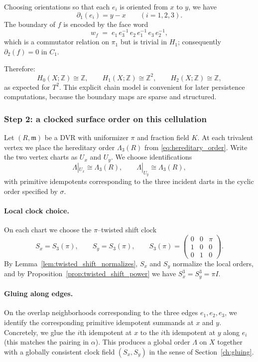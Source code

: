 \documentclass[11pt,oneside]{amsbook}
\numberwithin{equation}{section}
\theoremstyle{plain}
\theoremstyle{definition}
\theoremstyle{remark}
\newcommand{\Z}{\mathbb{Z}}
\begin{document}
Choosing orientations so that each $e_i$ is oriented from $x$ to $y$, we have
\[
\partial_1(e_i)=y-x\qquad (i=1,2,3).
\]
The boundary of $f$ is encoded by the face word
\[
w_f \;=\; e_1\,e_3^{-1}\,e_2\,e_1^{-1}\,e_3\,e_2^{-1},
\]
which is a commutator relation on $\pi_1$ but is trivial in $H_1$; consequently $\partial_2(f)=0$ in $C_1$.

Therefore:
\[
H_0(X;\Z)\cong \Z,\qquad H_1(X;\Z)\cong \Z^2,\qquad H_2(X;\Z)\cong \Z,
\]
as expected for $T^2$.
This explicit chain model is convenient for later persistence computations, because the boundary maps are sparse and structured.

\subsubsection{Step 2: a clocked surface order on this cellulation}

Let $(R,\mathfrak m)$ be a DVR with uniformizer $\pi$ and fraction field $K$.
At each trivalent vertex we place the hereditary order $\Lambda_3(R)$ from \eqref{eq:hereditary_order}.
Write the two vertex charts as $U_x$ and $U_y$.
We choose identifications
\[
\Lambda|_{U_x}\cong \Lambda_3(R),\qquad \Lambda|_{U_y}\cong \Lambda_3(R),
\]
with primitive idempotents corresponding to the three incident darts in the cyclic order specified by $\sigma$.

\paragraph{Local clock choice.}
On each chart we choose the $\pi$--twisted shift clock
\[
S_x=S_3(\pi),\qquad S_y=S_3(\pi),
\qquad 
S_3(\pi)=
\begin{pmatrix}
0&0&\pi\\
1&0&0\\
0&1&0
\end{pmatrix}.
\]
By Lemma~\ref{lem:twisted_shift_normalizes}, $S_x$ and $S_y$ normalize the local orders, and by Proposition~\ref{prop:twisted_shift_power} we have $S_x^3=S_y^3=\pi I$.

\paragraph{Gluing along edges.}
On the overlap neighborhoods corresponding to the three edges $e_1,e_2,e_3$, we identify the corresponding primitive idempotent summands at $x$ and $y$.
Concretely, we glue the $i$th idempotent at $x$ to the $i$th idempotent at $y$ along $e_i$ (this matches the pairing in $\alpha$).
This produces a global order $\Lambda$ on $X$ together with a globally consistent clock field $(S_x,S_y)$ in the sense of Section~\ref{ch:gluing}.
\end{document}
